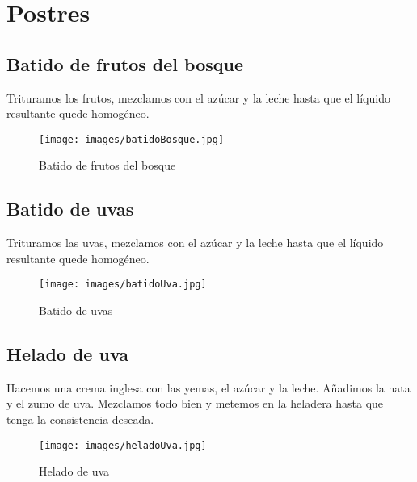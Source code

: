 \section{Postres}
\label{sec:postres}

\subsection{Batido de frutos del bosque}
\label{sec:batido}

Trituramos los frutos, mezclamos con el azúcar y la leche hasta que el líquido resultante quede homogéneo.

\begin{figure}[h]
  \begin{center}
    \texttt{[image: images/batidoBosque.jpg]}
    \caption{Batido de frutos del bosque}
    \label{fig:batidoBosque}
  \end{center}
\end{figure}

\subsection{Batido de uvas}
\label{sec:batidoUva}
Trituramos las uvas, mezclamos con el azúcar y la leche hasta que el líquido resultante quede homogéneo.

\begin{figure}[h]
  \begin{center}
    \texttt{[image: images/batidoUva.jpg]}
    \caption{Batido de uvas}
    \label{fig:batidoUva}
  \end{center}
\end{figure}

\subsection{Helado de uva}
\label{sec:heladoUva}

Hacemos una crema inglesa con las yemas, el azúcar y la leche. Añadimos la nata y el zumo de uva. Mezclamos todo bien y metemos en la heladera hasta que tenga la consistencia deseada.

\begin{figure}[h]
  \begin{center}
    \texttt{[image: images/heladoUva.jpg]}
    \caption{Helado de uva}
    \label{fig:heladoUva}
  \end{center}
\end{figure}

